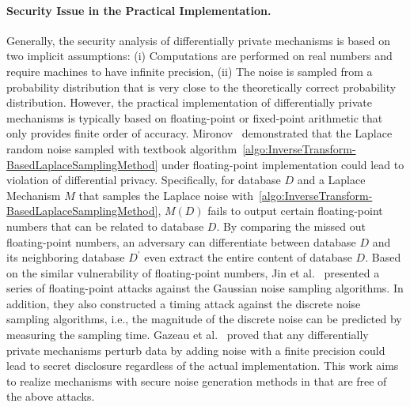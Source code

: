 \paragraph{Security Issue in the Practical Implementation.}
\label{para:SecurityIssueinthePracticalImplementation}
Generally, the security analysis of differentially private mechanisms is based on two implicit assumptions: (i) Computations are performed on real numbers and require machines to have infinite precision, (ii) The noise is sampled from a probability distribution that is very close to the theoretically correct probability distribution.
However, the practical implementation of differentially private mechanisms is typically based on floating-point or fixed-point arithmetic that only provides finite order of accuracy.
Mironov~\cite{mironov2012significance} demonstrated that the Laplace random noise sampled with textbook algorithm~\autoref{algo:InverseTransform-BasedLaplaceSamplingMethod} under floating-point implementation could lead to violation of differential privacy.
Specifically, for database $D$ and a Laplace Mechanism $M$ that samples the Laplace noise with~\autoref{algo:InverseTransform-BasedLaplaceSamplingMethod}, $M\left(D\right) $ fails to output certain floating-point numbers that can be related to database $D$. By comparing the missed out floating-point numbers, an adversary can differentiate between database $D$ and its neighboring database $D^{\prime}$ even extract the entire content of database $D$.
Based on the similar vulnerability of floating-point numbers, Jin et al.~\cite{jin2022we} presented a series of floating-point attacks against the Gaussian noise sampling algorithms. In addition, they also constructed a timing attack against the discrete noise sampling algorithms, i.e., the magnitude of the discrete noise can be predicted by measuring the sampling time.
Gazeau et al.~\cite{gazeau2016preserving} proved that any differentially private mechanisms perturb data by adding noise with a finite precision could lead to secret disclosure regardless of the actual implementation.
This work aims to realize \differentialprivacy mechanisms with secure noise generation methods in \smpc that are free of the above attacks.




